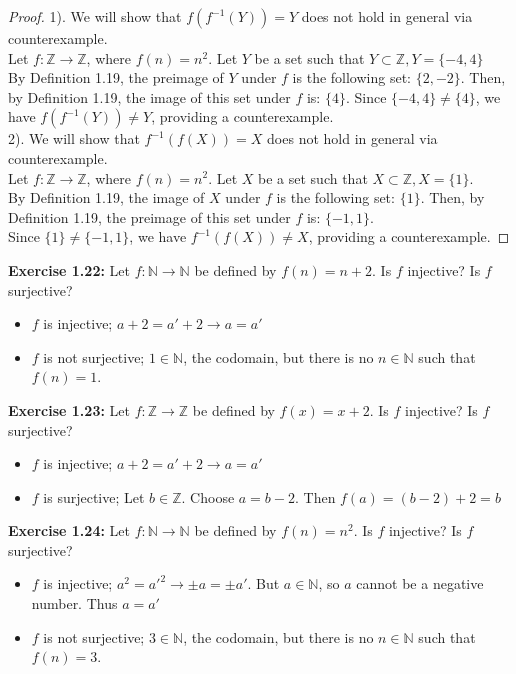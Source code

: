 \documentclass[11pt]{article}
\begin{document}
\begin{proof}
1). We will show that $f(f^{-1}(Y)) = Y$ does not hold in general via counterexample. \\
Let $f: \mathds{Z} \rightarrow \mathds{Z}$, where $f(n) = n^2$. Let $Y$ be a set such that $Y \subset \mathds{Z}, Y = \{-4, 4\}$ \\
By Definition 1.19, the preimage of $Y$ under $f$ is the following set: $\{2, -2\}$. Then, by Definition 1.19, the image of this set under $f$ is: $\{4\}$.
Since $\{-4, 4\} \neq \{4\}$, we have $f(f^{-1}(Y)) \neq Y$, providing a counterexample.\\
2). We will show that $f^{-1}(f(X)) = X$ does not hold in general via counterexample. \\
Let $f: \mathds{Z} \rightarrow \mathds{Z}$, where $f(n) = n^2$. Let $X$ be a set such that $X \subset \mathds{Z}, X = \{1\}$. \\
By Definition 1.19, the image of $X$ under $f$ is the following set: $\{1\}$. Then, by Definition 1.19, the preimage of this set under $f$ is: $\{-1, 1\}$. \\
Since $\{1\} \neq \{-1, 1\}$, we have $f^{-1}(f(X)) \neq X$, providing a counterexample.
\end{proof}
\noindent\textbf{Exercise 1.22:} Let $f:{\mathbb N}\rightarrow {\mathbb N}$ be defined by $f(n)=n+2$.  Is $f$ injective?  Is $f$ surjective?
\begin{itemize}
    \item $f$ is injective; $a + 2 = a' + 2 \rightarrow a = a'$
    \item $f$ is not surjective; $1 \in \mathds{N}$, the codomain, but there is no $n \in \mathbb{N}$ such that $f(n) = 1$.
\end{itemize}
\noindent\textbf{Exercise 1.23:} Let $f:{\mathbb Z}\rightarrow {\mathbb Z}$ be defined by $f(x)=x+2$.  Is $f$ injective?  Is $f$ surjective?
\begin{itemize}
    \item $f$ is injective; $a + 2 = a' + 2 \rightarrow a = a'$
    \item $f$ is surjective; Let $b \in \mathbb{Z}$. Choose $a = b - 2$. Then $f(a) = (b-2) + 2 = b$
\end{itemize}
\noindent\textbf{Exercise 1.24:} Let $f:{\mathbb N}\rightarrow {\mathbb N}$ be defined by $f(n)=n^2$.  Is $f$ injective?  Is $f$ surjective?
\begin{itemize}
    \item $f$ is injective; $a^2 = a'^2 \rightarrow \pm a = \pm a'.$ But $a\in \mathds{N}$, so $a$ cannot be a negative number. Thus $a = a'$
    \item $f$ is not surjective; $3 \in \mathds{N}$, the codomain, but there is no $n \in \mathds{N}$ such that $f(n) = 3$.
\end{itemize}
\end{document}
